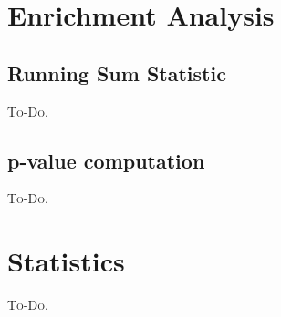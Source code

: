 
\section{Enrichment Analysis}

\subsection{Running Sum Statistic}
\textsc{To-Do.}

\subsection{p-value computation}
\textsc{To-Do.}

\section{Statistics}
\textsc{To-Do.}

